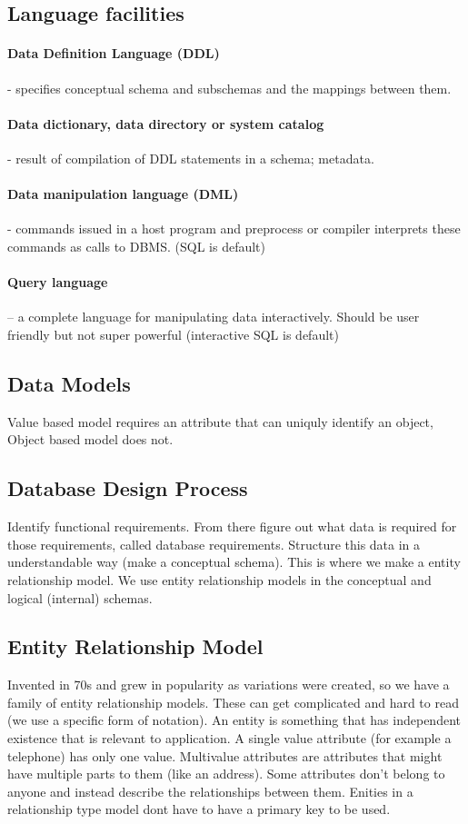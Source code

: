 \documentclass{article}
\begin{document}
\subsection{Language facilities}
\paragraph{Data Definition Language (DDL)} - specifies conceptual schema and subschemas and the mappings between them.
\paragraph{Data dictionary, data directory or system catalog} - result of compilation of DDL statements in a schema; metadata.
\paragraph{Data manipulation language (DML)} - commands issued in a host program and preprocess or compiler interprets these commands as calls to DBMS. (SQL is default)
\paragraph{Query language} – a complete language for manipulating data interactively. Should be user friendly but not super powerful (interactive SQL is default)

\subsection{Data Models}
Value based model requires an attribute that can uniquly identify an object, Object based model does not.

\subsection{Database Design Process}
Identify functional requirements. From there figure out what data is required for those requirements, called database requirements. Structure this data in a understandable way (make a conceptual schema). This is where we make a entity relationship model. We use entity relationship models in the conceptual and logical (internal) schemas.

\subsection{Entity Relationship Model}
Invented in 70s and grew in popularity as variations were created, so we have a family of entity relationship models. These can get complicated and hard to read (we use a specific form of notation). An entity is something that has independent existence that is relevant to application. A single value attribute (for example a telephone) has only one value. Multivalue attributes are attributes that might have multiple parts to them (like an address). Some attributes don't belong to anyone and instead describe the relationships between them. Enities in a relationship type model dont have to have a primary key to be used.
\end{document}
